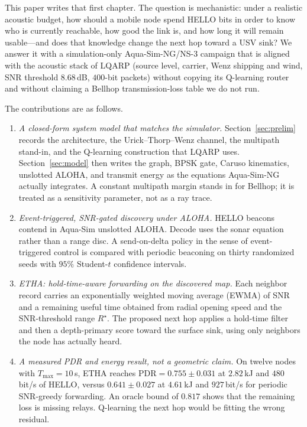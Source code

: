 \documentclass[journal]{IEEEtran}
\begin{document}
This paper writes that first chapter. The question is mechanistic:
under a realistic acoustic budget, how should a mobile node spend
HELLO bits in order to know who is currently reachable, how good the
link is, and how long it will remain usable---and does that knowledge
change the next hop toward a USV sink? We answer it with a
simulation-only Aqua-Sim-NG/NS-3 campaign \cite{xie2009aquasim,aquasimng,ns3manual}
that is aligned with the acoustic stack of LQARP (source level, carrier,
Wenz shipping and wind, SNR threshold $8.68$\,dB, $400$-bit packets)
without copying its Q-learning router and without claiming a Bellhop
transmission-loss table we do not run.

The contributions are as follows.

\begin{enumerate}
\item \emph{A closed-form system model that matches the simulator.}
Section~\ref{sec:prelim} records the architecture, the Urick--Thorp--Wenz
channel, the multipath stand-in, and the Q-learning construction that
LQARP uses. Section~\ref{sec:model} then writes the graph, BPSK gate,
Caruso kinematics, unslotted ALOHA, and transmit energy as the
equations Aqua-Sim-NG actually integrates. A constant multipath margin
stands in for Bellhop; it is treated as a sensitivity parameter, not as
a ray trace.
\item \emph{Event-triggered, SNR-gated discovery under ALOHA.}
HELLO beacons contend in Aqua-Sim unslotted ALOHA. Decode uses the
sonar equation rather than a range disc. A send-on-delta policy in the
sense of event-triggered control \cite{tabuada2007event,heemels2012event}
is compared with periodic beaconing on thirty randomized seeds with
$95\%$ Student-$t$ confidence intervals.
\item \emph{ETHA: hold-time-aware forwarding on the discovered map.}
Each neighbor record carries an exponentially weighted moving average
(EWMA) of SNR \cite{woo2003taming} and a remaining useful time obtained
from radial opening speed and the SNR-threshold range $R^{\star}$.
The proposed next hop applies a hold-time filter and then a
depth-primary score toward the surface sink, using only neighbors the
node has actually heard.
\item \emph{A measured PDR and energy result, not a geometric claim.}
On twelve nodes with $T_{\max}=10$\,s, ETHA reaches
$\mathrm{PDR}=0.755\pm 0.031$ at $2.82$\,kJ and $480$\,bit/s of HELLO,
versus $0.641\pm 0.027$ at $4.61$\,kJ and $927$\,bit/s for periodic
SNR-greedy forwarding. An oracle bound of $0.817$ shows that the
remaining loss is missing relays. Q-learning the next hop would be
fitting the wrong residual.
\end{enumerate}
\end{document}

